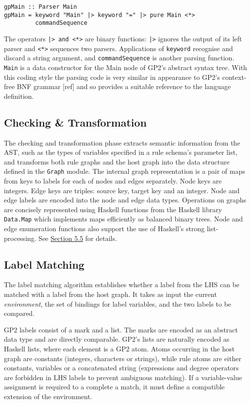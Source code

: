 \begin{verbatim}
gpMain :: Parser Main
gpMain = keyword "Main" |> keyword "=" |> pure Main <*> 
         commandSequence
\end{verbatim}

The operators \texttt{|> and <*>} are binary functions: \texttt{|>} ignores the output of its left parser and \texttt{<*>} sequences two parsers. Applications of \texttt{keyword} recognise and discard a string argument, and \texttt{commandSequence} is another parsing function. \texttt{Main} is a data constructor for the Main node of GP2's abstract syntax tree. With this coding style the parsing code is very similar in appearance to GP2's context-free BNF grammar [ref] and so provides a suitable reference to the language definition.

\subsection{Checking \& Transformation}

The checking and transformation phase extracts semantic information from the AST, such as the types of variables specified in a rule schema's parameter list, and transforms both rule graphs and the host graph into the data structure defined in the \texttt{Graph} module. The internal graph representation is a pair of maps from keys to labels for each of nodes and edges separately. Node keys are integers. Edge keys are triples: source key, target key and an integer. Node and edge labels are encoded into the node and edge data types. Operations on graphs are concisely represented using Haskell functions from the Haskell library \texttt{Data.Map} which implements maps efficiently as balanced binary trees. Node and edge enumeration functions also support the use of Haskell's strong list-processing. See \hyperref[sec:graph-match]{Section 5.5} for details.

\subsection{Label Matching}
The label matching algorithm establishes whether a label from the LHS can be matched with a label from the host graph. It takes as input the current \textit{environment}, the set of bindings for label variables, and the two labels to be compared. 

GP2 labels consist of a mark and a list. The marks are encoded as an abstract data type and are directly comparable. GP2's lists are naturally encoded as Haskell lists, where each element is a GP2 atom. Atoms occurring in the host graph are constants (integers, characters or strings), while rule atoms are either constants, variables or a concatenated string (expressions and degree operators are forbidden in LHS labels to prevent ambiguous matching). If a variable-value assignment is required to a complete a match, it must define a compatible extension of the environment.

